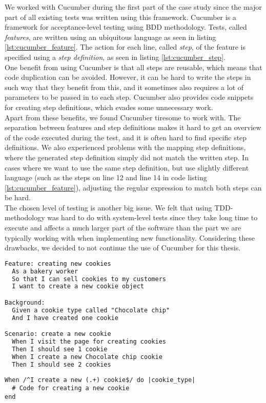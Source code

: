 
We worked with Cucumber during the first part of the case study since
the major part of all existing tests was written using this framework.
Cucumber is a framework for acceptance-level testing using BDD
methodology. Tests, called \emph{features}, are written using an
ubiquitous language as seen in listing \ref{lst:cucumber_feature}. The
action for each line, called \emph{step}, of the feature is specified
using a \emph{step definition}, as seen in listing
\ref{lst:cucumber_step}.\cite{web:cucumber}\\

One benefit from using Cucumber is that all steps are reusable, which
means that code duplication can be avoided. However, it can be hard to
write the steps in such way that they benefit from this, and it
sometimes also requires a lot of parameters to be passed in to each
step. Cucumber also provides code snippets for creating step
definitions, which evades some unnecessary work.\\

Apart from these benefits, we found Cucumber tiresome to work with. The
separation between features and step definitions makes it hard to get an
overview of the code executed during the test, and it is often hard to
find specific step definitions. We also experienced problems with the
mapping step definitions, where the generated step definition simply did
not match the written step. In cases where we want to use the same step
definition, but use slightly different language (such as the steps on
line 12 and line 14 in code listing \ref{lst:cucumber_feature}),
adjusting the regular expression to match both steps can be hard.\\

The chosen level of testing is another big issue. We felt that using
TDD-methodology was hard to do with system-level tests since they take
long time to execute and affects a much larger part of the software than
the part we are typically working with when implementing new
functionality. Considering these drawbacks, we decided to not continue
the use of Cucumber for this thesis.\\


\begin{lstlisting}[caption=Example of a Cucumber test.,
                   label=lst:cucumber_feature, float=t, language=HTML]
Feature: creating new cookies
  As a bakery worker
  So that I can sell cookies to my customers
  I want to create a new cookie object

Background:
  Given a cookie type called "Chocolate chip"
  And I have created one cookie

Scenario: create a new cookie
  When I visit the page for creating cookies
  Then I should see 1 cookie
  When I create a new Chocolate chip cookie
  Then I should see 2 cookies
\end{lstlisting}


\begin{lstlisting}[caption=Cucumber step definition for the step on row 13 in code listing \ref{lst:cucumber_feature}.,
                   label=lst:cucumber_step, float=t]
When /^I create a new (.+) cookie$/ do |cookie_type|
  # Code for creating a new cookie
end
\end{lstlisting}
